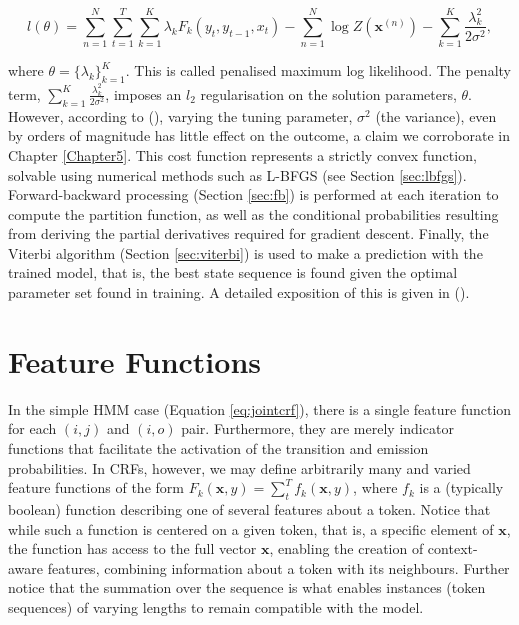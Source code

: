 \begin{equation}
l(\theta) = \sum_{n=1}^N\sum_{t=1}^T\sum_{k=1}^K\lambda_kF_{k}(y_t, y_{t-1}, x_t) - \sum_{n=1}^N\log Z(\mathbf{x}^{(n)}) - \sum_{k=1}^K \frac{\lambda_k^2}{2\sigma^2},
\end{equation}

where $\theta = \{\lambda_k\}_{k=1}^K$. This is called penalised maximum log likelihood. The penalty term, $\sum_{k=1}^K\frac{\lambda_k^2}{2\sigma^2}$, imposes an $l_2$ regularisation on the solution parameters, $\theta$. However, according to (\cite{mccallum2000maximum}), varying the tuning parameter, $\sigma^2$ (the variance), even by orders of magnitude has little effect on the outcome, a claim we corroborate in Chapter \ref{Chapter5}. This cost function represents a strictly convex function, solvable using numerical methods such as L-BFGS (see Section \ref{sec:lbfgs}). Forward-backward processing (Section \ref{sec:fb}) is performed at each iteration to compute the partition function, as well as the conditional probabilities resulting from deriving the partial derivatives required for gradient descent. Finally, the Viterbi algorithm (Section \ref{sec:viterbi}) is used to make a prediction with the trained model, that is, the best state sequence is found given the optimal parameter set found in training. A detailed exposition of this is given in (\cite{mccallum2000maximum}).

\section{Feature Functions}
\label{sec:featurefunctions}

In the simple HMM case (Equation \ref{eq:jointcrf}), there is a single feature function for each $(i, j)$ and $(i, o)$ pair. Furthermore, they are merely indicator functions that facilitate the activation of the transition and emission probabilities. In CRFs, however, we may define arbitrarily many and varied feature functions of the form $F_k(\mathbf{x}, y) = \sum_t^T f_k(\mathbf{x}, y)$, where $f_k$ is a (typically boolean) function describing one of several features about a token. Notice that while such a function is centered on a given token, that is, a specific element of $\mathbf{x}$, the function has access to the full vector $\mathbf{x}$, enabling the creation of context-aware features, combining information about a token with its neighbours. Further notice that the summation over the sequence is what enables instances (token sequences) of varying lengths to remain compatible with the model.

